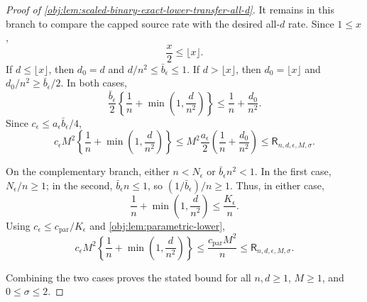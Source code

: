 \documentclass[11pt]{article}
\begin{document}
\begin{proof}[Proof of \cref{obj:lem:scaled-binary-exact-lower-transfer-all-d}]
It remains in this branch to compare the capped source rate with the desired all-\(d\) rate.  Since \(1\le x\),
\[
\frac{x}{2}\le \lfloor x\rfloor .
\] %
If \(d\le\lfloor x\rfloor\), then \(d_0=d\) and \(d/n^2\le \bar b_\epsilon\le1\).  If \(d>\lfloor x\rfloor\), then
\(d_0=\lfloor x\rfloor\) and \(d_0/n^2\ge \bar b_\epsilon/2\).  In both cases,
\[
\frac{\bar b_\epsilon}{2}
\left\{\frac1n+\min\left(1,\frac d{n^2}\right)\right\}
\le
\frac1n+\frac{d_0}{n^2}.
\] %
Since \(c_\epsilon\le a_\epsilon \bar b_\epsilon/4\),
\[
c_\epsilon M^2
\left\{\frac1n+\min\left(1,\frac d{n^2}\right)\right\}
\le
M^2\frac{a_\epsilon}{2}
\left(\frac1n+\frac{d_0}{n^2}\right)
\le
\mathsf R_{n,d,\epsilon,M,\sigma}.
\] %

On the complementary branch, either \(n<N_\epsilon\) or \(\bar b_\epsilon n^2<1\).  In the first case, \(N_\epsilon/n\ge1\); in the second, \(\bar b_\epsilon n\le1\), so \((1/\bar b_\epsilon)/n\ge1\).  Thus, in either case,
\[
\frac1n+\min\left(1,\frac d{n^2}\right)
\le
\frac{K_\epsilon}{n}.
\] %
Using \(c_\epsilon\le c_{\mathrm{par}}/K_\epsilon\) and
\cref{obj:lem:parametric-lower},
\[
c_\epsilon M^2
\left\{\frac1n+\min\left(1,\frac d{n^2}\right)\right\}
\le
\frac{c_{\mathrm{par}}M^2}{n}
\le
\mathsf R_{n,d,\epsilon,M,\sigma}.
\] %

Combining the two cases proves the stated bound for all \(n,d\ge1\), \(M\ge1\), and \(0\le\sigma\le2\). %
\end{proof}
\end{document}
